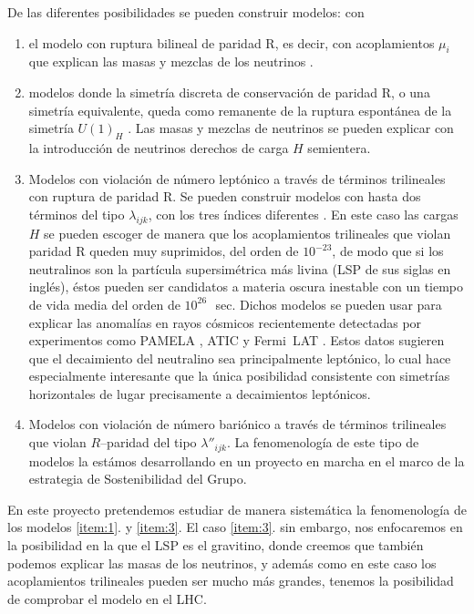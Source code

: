 De las diferentes posibilidades se pueden construir modelos: con 
\begin{enumerate}
\item el modelo con ruptura bilineal de paridad R, es decir, con
  acoplamientos $\mu_i$ que explican las masas y mezclas de los
  neutrinos \cite{Mira:2000gg,Dreiner:2003hw,Dreiner:2006xw}.
\label{item:1}
\item modelos donde la simetría discreta de conservación de
  paridad R, o una simetría equivalente, queda como remanente de la
  ruptura espontánea de la simetría $U(1)_H$
  \cite{Dreiner:2003hw,Dreiner:2003yr,Dreiner:2007vp}. Las masas y
  mezclas de neutrinos se pueden explicar con la introducción de
  neutrinos derechos de carga $H$ semientera.
\label{item:2}
\item Modelos con violación de número leptónico a través de términos
  trilineales con ruptura de paridad R. Se pueden construir modelos
  con hasta dos términos del tipo $\lambda_{ijk}$, con los tres
  índices diferentes \cite{Sierra:2009zq}.  En este caso las cargas
  $H$ se pueden escoger de manera que los acoplamientos trilineales
  que violan paridad R queden muy suprimidos, del orden de $10^{-23}$,
  de modo que si los neutralinos son la partícula supersimétrica más
  livina (LSP de sus siglas en inglés), éstos pueden ser candidatos a
  materia oscura inestable con un tiempo de vida media del orden de
  $10^{26}\,$~sec. Dichos modelos se pueden usar para explicar las
  anomalías en rayos cósmicos \cite{Sierra:2009zq} recientemente
  detectadas por experimentos como PAMELA \cite{Adriani:2008zr}, ATIC
  \cite{:2008zzr} y Fermi~LAT \cite{Abdo:2009zk}. Estos datos sugieren
  que el decaimiento del neutralino sea principalmente leptónico, lo
  cual hace especialmente interesante que la única posibilidad
  consistente con simetrías horizontales de lugar precisamente a
  decaimientos leptónicos.
\label{item:3}
\item Modelos con violación de número bariónico a través de términos
  trilineales que violan $R$--paridad del tipo $\lambda''_{ijk}$. La
  fenomenología de este tipo de modelos la estámos desarrollando en un
  proyecto en marcha en el marco de la estrategia de Sostenibilidad
  del Grupo.
\label{item:4}
\end{enumerate}
En este proyecto pretendemos estudiar de manera sistemática la
fenomenología de los modelos \ref{item:1}. y \ref{item:3}. El caso
\ref{item:3}. sin embargo, nos enfocaremos en la posibilidad en la que
el LSP es el gravitino, donde creemos que también podemos explicar las
masas de los neutrinos, y además como en este caso los acoplamientos
trilineales pueden ser mucho más grandes, tenemos la posibilidad de
comprobar el modelo en el LHC.

